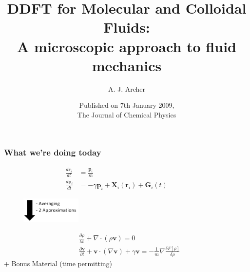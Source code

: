 \documentclass[aspectratio=169,xcolor=dvipsnames]{beamer}
\begin{document}
\title[]{DDFT for Molecular and Colloidal Fluids:\\
A microscopic approach to fluid mechanics}
\author[]{A. J. Archer}
\date{Published on 7th January 2009, \\ The Journal of Chemical Physics}

\begin{frame}
\titlepage
\end{frame}
 
 

\begin{frame}
	\frametitle{What we're doing today}
	
	\begin{align*}
	\frac{d \mathbf{r}_i}{dt} &= \frac{\mathbf{p}_i}{m}\\
	\frac{d \mathbf{p}_i}{dt} &= - \gamma \mathbf{p}_i + \mathbf{X}_i(\mathbf{r}_i) + \mathbf{G}_i(t) \qquad \quad
	\end{align*}
	\vspace{-0.5cm}
	\begin{figure}
		\includegraphics[width=3cm]{Arrow.png}
	\end{figure}
    \vspace{-0.3cm}
	\begin{align*}
	&\frac{\partial \rho}{\partial t} + \nabla \cdot \left(\rho \mathbf{v}\right) = 0 \\
	&\frac{\partial \mathbf{v}}{\partial t} + \mathbf{v} \cdot \left(\nabla \mathbf{v}\right) + \gamma \mathbf{v} = - \frac{1}{m}  \nabla \frac{\delta {F}[\rho]}{\delta \rho}
	\end{align*}
+ Bonus Material (time permitting)	
\end{frame}
\end{document}
